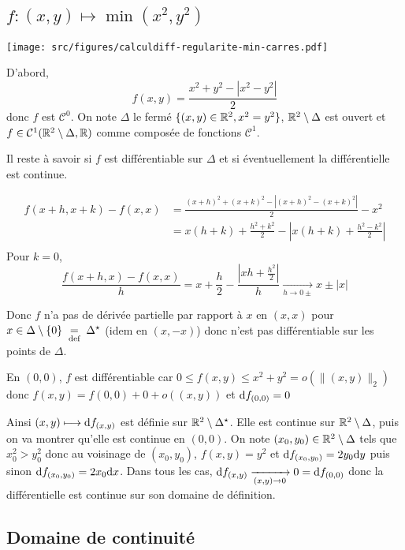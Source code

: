 \subsection{\texorpdfstring{$f:(x, y)\longmapsto \min(x^2, y^2)$}{f(x, y)=min(x², y²)}}

\begin{center}
    \texttt{[image: src/figures/calculdiff-regularite-min-carres.pdf]}
\end{center}

D'abord, \[
    f(x, y)=\frac{x^2+y^2-|x^2-y^2|}2
\]
donc $f$ est $\mathcal C^0$. On note $\Delta$ le fermé $\{(x, y)\in\mathbb R^2, x^2=y^2\}$, $\mathbb R^2\setminus \Delta$ est ouvert et $f\in \mathcal C^1(\mathbb R^2\setminus \Delta, \mathbb R)$ comme composée de fonctions $\mathcal C^1$.

Il reste à savoir si $f$ est différentiable sur $\Delta$ et si éventuellement la différentielle est continue.

\begin{align*}
    f(x+h, x+k)-f(x,x) &= \frac{(x+h)^2+(x+k)^2-|(x+h)^2-(x+k)^2|}{2}-x^2 \\
                       &= x(h+k)+\frac{h^2+k^2}2 - \left|x(h+k)+ \frac{h^2-k^2}{2}  \right| \\
\end{align*}
Pour $k=0$, \[
    \frac{f(x+h, x)-f(x, x)}h=x+\frac h2-\frac{\left|xh+\frac{h^2}2\right|}h\xrightarrow[h\to0\pm]{}x\pm|x|
\]

Donc $f$ n'a pas de dérivée partielle par rapport à $x$ en $(x, x)$ pour $x\in\Delta\setminus\{0\}\;\underset{\text{def}}=\;\Delta^\star$ (idem en $(x, -x)$) donc n'est pas différentiable sur les points de $\Delta$.

En $(0, 0)$, $f$ est différentiable car $0\leq f(x, y)\leq x^2+y^2=o(\|(x, y)\|_2)$ donc $f(x, y)=f(0, 0)+0+o((x, y))$ et $\mathrm{d} f_{(0, 0)}=0$

Ainsi $(x, y)\longmapsto \mathrm{d} f_{(x, y)}$ est définie sur $\mathbb R^2\setminus \Delta^\star$. Elle est continue sur $\mathbb R^2\setminus \Delta$, puis on va montrer qu'elle est continue en $(0, 0)$. On note $(x_0, y_0)\in\mathbb R^2\setminus \Delta$ tels que $x_0^2>y_0^2$ donc au voisinage de $(x_0, y_0)$, $f(x, y)=y^2$ et $\mathrm{d} f_{(x_0, y_0)}=2y_0\mathrm{d} y$ puis sinon $\mathrm{d} f_{(x_0, y_0)}=2x_0\mathrm{d} x$. Dans tous les cas, $\mathrm{d} f_{(x, y)}\xrightarrow[(x, y)\to 0]{}0=\mathrm{d} f_{(0, 0)}$ donc la différentielle est continue sur son domaine de définition.

\subsection{Domaine de continuité}

